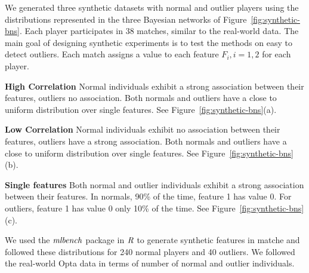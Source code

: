 We generated three synthetic datasets with normal and outlier players using the distributions represented in the three Bayesian networks of Figure~\ref{fig:synthetic-bns}. 
 Each player participates in 38 matches, similar to the real-world data. The main goal of designing synthetic experiments is to test the methods on  easy to detect outliers. Each match assigns a value to each feature $F_i, i =  1,2$ for each player. 
 \begin{description}
 	\item\textbf{High Correlation}  Normal individuals exhibit a strong association between their features, outliers no association. Both normals and outliers have a close to uniform distribution over single features. See Figure~\ref{fig:synthetic-bns}(a).
 	\item\textbf{Low Correlation}  Normal individuals exhibit no association between their features, outliers have a strong association. Both normals and outliers have a close to uniform distribution over single features. See Figure~\ref{fig:synthetic-bns}(b).
 	\item\textbf{Single features}  Both normal and outlier individuals exhibit a strong association between their features. In normals, 90\% of the time, feature 1 has value 0. For outliers, feature 1 has value 0 only 10\% of the time. See Figure~\ref{fig:synthetic-bns}(c).
 \end{description}
 We used the $\it{mlbench}$ package in $\it{R}$ to generate synthetic features in matche and followed these distributions for 240 normal players and 40 outliers. We followed the real-world Opta data in terms of number of normal and outlier individuals. %
 
